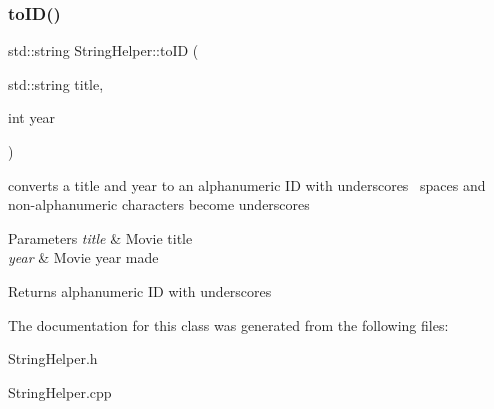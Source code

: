 \subsubsection{\texorpdfstring{to\+I\+D()}{toID()}}
{\footnotesize\ttfamily std\+::string String\+Helper\+::to\+ID (\begin{DoxyParamCaption}\item[{std\+::string}]{title,  }\item[{int}]{year }\end{DoxyParamCaption})\hspace{0.3cm}{\ttfamily [static]}}

converts a title and year to an alphanumeric ID with underscores~\newline
spaces and non-\/alphanumeric characters become underscores 
\begin{DoxyParams}{Parameters}
{\em title} & Movie title \\
\hline
{\em year} & Movie year made \\
\hline
\end{DoxyParams}
\begin{DoxyReturn}{Returns}
alphanumeric ID with underscores 
\end{DoxyReturn}


The documentation for this class was generated from the following files\+:\begin{DoxyCompactItemize}
\item 
String\+Helper.\+h\item 
String\+Helper.\+cpp\end{DoxyCompactItemize}
